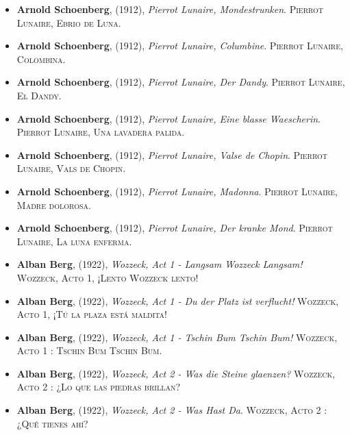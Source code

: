 \documentclass[paper=a4, fontsize=11pt, spanish]{scrartcl}
\numberwithin{equation}{section} %
\numberwithin{figure}{section} %
\numberwithin{table}{section} %
\begin{document}
\begin{itemize}

\item \textbf{Arnold Schoenberg}, (1912), \textit{Pierrot Lunaire, Mondestrunken}. \textsc{ Pierrot Lunaire, Ebrio de Luna}. %
\item \textbf{Arnold Schoenberg}, (1912), \textit{Pierrot Lunaire, Columbine}. \textsc{ Pierrot Lunaire, Colombina}. %
\item \textbf{Arnold Schoenberg}, (1912), \textit{Pierrot Lunaire, Der Dandy}. \textsc{ Pierrot Lunaire, El Dandy}. %
\item \textbf{Arnold Schoenberg}, (1912), \textit{Pierrot Lunaire, Eine blasse Waescherin}. \textsc{ Pierrot Lunaire, Una lavadera palida}. %
\item \textbf{Arnold Schoenberg}, (1912), \textit{Pierrot Lunaire, Valse de Chopin}. \textsc{ Pierrot Lunaire, Vals de Chopin}. %
\item \textbf{Arnold Schoenberg}, (1912), \textit{Pierrot Lunaire, Madonna}. \textsc{ Pierrot Lunaire, Madre dolorosa}. %
\item \textbf{Arnold Schoenberg}, (1912), \textit{Pierrot Lunaire, Der kranke Mond}. \textsc{ Pierrot Lunaire, La luna enferma}. %
\item \textbf{Alban Berg}, (1922), \textit{Wozzeck, Act 1 - Langsam Wozzeck Langsam!} \textsc{ Wozzeck, Acto 1, ¡Lento Wozzeck lento!} %
\item \textbf{Alban Berg}, (1922), \textit{Wozzeck, Act 1 - Du der Platz ist verflucht!} \textsc{ Wozzeck, Acto 1, ¡Tú la plaza está maldita!} %
\item \textbf{Alban Berg}, (1922), \textit{Wozzeck, Act 1 - Tschin Bum Tschin Bum!} \textsc{ Wozzeck, Acto 1 : Tschin Bum Tschin Bum}. %
\item \textbf{Alban Berg}, (1922), \textit{Wozzeck, Act 2 - Was die Steine glaenzen?} \textsc{ Wozzeck, Acto 2 : ¿Lo que las piedras brillan?} %
\item \textbf{Alban Berg}, (1922), \textit{Wozzeck, Act 2 - Was Hast Da}. \textsc{ Wozzeck, Acto 2 : ¿Qué tienes ahí?} %

\end{itemize}
\end{document}
